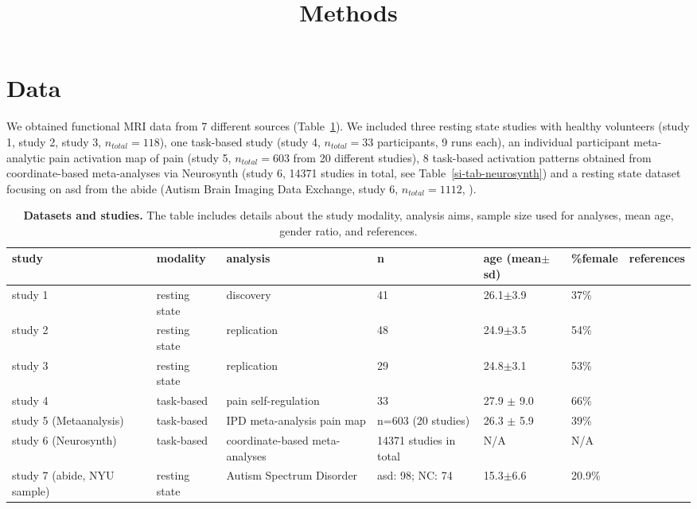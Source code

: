 \documentclass{article}
\title{Methods}
\date{\displaydate{articleDate}}
\author{}
\begin{document}
\maketitle


\keywords{}

\section{Data}

We obtained functional MRI data from 7 different sources (Table~\ref{tab-samples}).
We included three resting state studies with healthy volunteers (study 1, study 2, study 3, $n_{total}=118$), one task-based study (study 4, $n_{total}=33$ participants, 9 runs each), an individual participant meta-analytic pain activation map of pain (study 5, $n_{total}=603$ from 20 different studies), 8 task-based activation patterns obtained from coordinate-based meta-analyses via Neurosynth (study 6, 14371 studies in total, see Table~\ref{si-tab-neurosynth}) and a resting state dataset focusing on \acrshort{asd} from the \acrshort{abide} (Autism Brain Imaging Data Exchange, study 6, $n_{total}=1112$, \cite{di2014autism}).

\begin{table}
\centering
\caption[]{\textbf{Datasets and studies.} The table includes details about the study modality, analysis aims, sample size used for analyses, mean age, gender ratio, and references.}
\label{tab-samples}
\begin{tabular}{p{}p{}p{}p{}p{}p{}p{}}
\toprule
study & modality & analysis & n & age (mean$\pm$sd) & \%female & references \\
\hline
study 1 & resting state & discovery & 41 & 26.1$\pm$3.9 & 37\% & \cite{Spisak_2020} \\
study 2 & resting state & replication & 48 & 24.9$\pm$3.5 & 54\% & \cite{Spisak_2020} \\
study 3 & resting state & replication & 29 & 24.8$\pm$3.1 & 53\% & \cite{Spisak_2020} \\
study 4 & task-based & pain self-regulation & 33 & 27.9 $\pm$ 9.0 & 66\% & \cite{Woo_2015} \\
study 5 (Metaanalysis) & task-based & IPD meta-analysis pain map & n=603 (20 studies) & 26.3 $\pm$ 5.9 & 39\% & \cite{zunhammer2021meta} \\
study 6 (Neurosynth) & task-based & coordinate-based meta-analyses & 14371 studies in total & N/A & N/A & \cite{Yarkoni_2011} \\
study 7 (\acrshort{abide}, NYU sample) & resting state & Autism Spectrum Disorder & \acrshort{asd}: 98; NC: 74 & 15.3$\pm$6.6 & 20.9\% & \cite{di2014autism} \\
\bottomrule
\end{tabular}
\end{table}
\end{document}
